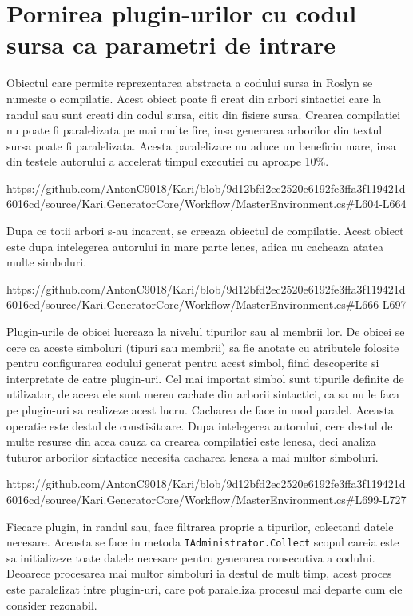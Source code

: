 \documentclass{report}
\begin{document}
\section{Pornirea plugin-urilor cu codul sursa ca parametri de intrare}

Obiectul care permite reprezentarea abstracta a codului sursa in Roslyn
se numeste o compilatie. Acest obiect poate fi creat din arbori
sintactici care la randul sau sunt creati din codul sursa, citit din
fisiere sursa. Crearea compilatiei nu poate fi paralelizata pe mai multe
fire, insa generarea arborilor din textul sursa poate fi paralelizata.
Acesta paralelizare nu aduce un beneficiu mare, insa din testele
autorului a accelerat timpul executiei cu aproape 10\%.

https://github.com/AntonC9018/Kari/blob/9d12bfd2ec2520e6192fe3ffa3f119421d6016cd/source/Kari.GeneratorCore/Workflow/MasterEnvironment.cs\#L604-L664

Dupa ce totii arbori s-au incarcat, se creeaza obiectul de compilatie.
Acest obiect este dupa intelegerea autorului in mare parte lenes, adica
nu cacheaza atatea multe simboluri.

https://github.com/AntonC9018/Kari/blob/9d12bfd2ec2520e6192fe3ffa3f119421d6016cd/source/Kari.GeneratorCore/Workflow/MasterEnvironment.cs\#L666-L697

Plugin-urile de obicei lucreaza la nivelul tipurilor sau al membrii lor.
De obicei se cere ca aceste simboluri (tipuri sau membrii) sa fie
anotate cu atributele folosite pentru configurarea codului generat
pentru acest simbol, fiind descoperite si interpretate de catre
plugin-uri. Cel mai importat simbol sunt tipurile definite de
utilizator, de aceea ele sunt mereu cachate din arborii sintactici, ca
sa nu le faca pe plugin-uri sa realizeze acest lucru. Cacharea de face
in mod paralel. Aceasta operatie este destul de constisitoare. Dupa
intelegerea autorului, cere destul de multe resurse din acea cauza ca
crearea compilatiei este lenesa, deci analiza tuturor arborilor
sintactice necesita cacharea lenesa a mai multor simboluri.

https://github.com/AntonC9018/Kari/blob/9d12bfd2ec2520e6192fe3ffa3f119421d6016cd/source/Kari.GeneratorCore/Workflow/MasterEnvironment.cs\#L699-L727

Fiecare plugin, in randul sau, face filtrarea proprie a tipurilor,
colectand datele necesare. Aceasta se face in metoda
\texttt{IAdministrator.Collect} scopul careia este sa initializeze toate
datele necesare pentru generarea consecutiva a codului. Deoarece
procesarea mai multor simboluri ia destul de mult timp, acest proces
este paralelizat intre plugin-uri, care pot paraleliza procesul mai
departe cum ele consider rezonabil.
\end{document}
